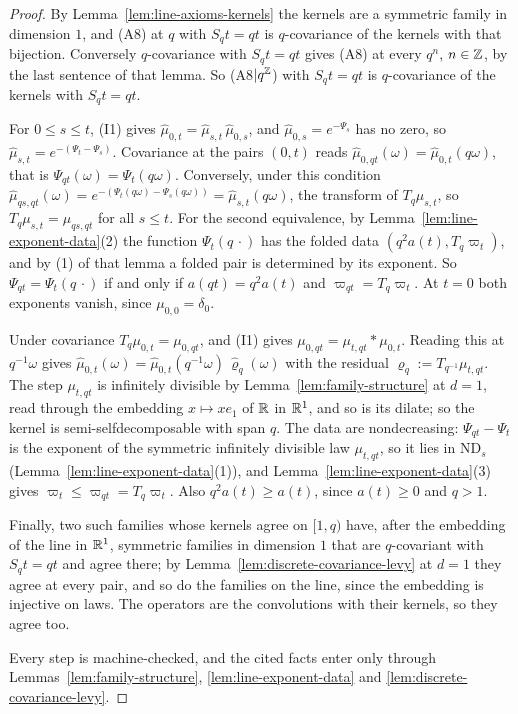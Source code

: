 \begin{proof}
By Lemma~\ref{lem:line-axioms-kernels} the kernels are a symmetric family in dimension $1$, and
(A8) at $q$ with $S_qt = qt$ is $q$-covariance of the kernels with that bijection. Conversely
$q$-covariance with $S_q t = qt$ gives (A8) at every $q^n$, $n \in \mathbb{Z}$, by the last sentence of
that lemma. So (A8$|q^{\mathbb{Z}}$) with $S_qt = qt$ is $q$-covariance of the kernels with
$S_qt = qt$.

For $0 \le s \le t$, (I1) gives $\widehat\mu_{0,t} = \widehat\mu_{s,t}\,\widehat\mu_{0,s}$, and
$\widehat\mu_{0,s} = e^{-\Psi_s}$ has no zero, so
$\widehat\mu_{s,t} = e^{-(\Psi_t - \Psi_s)}$. Covariance at the pairs $(0, t)$ reads
$\widehat\mu_{0,qt}(\omega) = \widehat\mu_{0,t}(q\omega)$, that is
$\Psi_{qt}(\omega) = \Psi_t(q\omega)$. Conversely, under this condition
$\widehat\mu_{qs,qt}(\omega) = e^{-(\Psi_t(q\omega) - \Psi_s(q\omega))} = \widehat\mu_{s,t}(q\omega)$,
the transform of $T_q\mu_{s,t}$, so $T_q\mu_{s,t} = \mu_{qs,qt}$ for all $s \le t$. For the
second equivalence, by Lemma~\ref{lem:line-exponent-data}(2) the function $\Psi_t(q\,\cdot)$ has
the folded data $(q^2a(t), T_q\varpi_t)$, and by (1) of that lemma a folded pair is determined by
its exponent. So $\Psi_{qt} = \Psi_t(q\,\cdot)$ if and only if $a(qt) = q^2a(t)$ and
$\varpi_{qt} = T_q\varpi_t$. At $t = 0$ both exponents vanish, since $\mu_{0,0} = \delta_0$.

Under covariance $T_q\mu_{0,t} = \mu_{0,qt}$, and (I1) gives
$\mu_{0,qt} = \mu_{t,qt} * \mu_{0,t}$. Reading this at $q^{-1}\omega$ gives
$\widehat\mu_{0,t}(\omega) = \widehat\mu_{0,t}(q^{-1}\omega)\,\widehat\varrho_q(\omega)$ with the
residual $\varrho_q := T_{q^{-1}}\mu_{t,qt}$. The step $\mu_{t,qt}$ is infinitely divisible by
Lemma~\ref{lem:family-structure} at $d = 1$, read through the embedding $x \mapsto xe_1$ of $\mathbb{R}$
in $\mathbb{R}^1$, and so is its dilate; so the kernel is semi-selfdecomposable with span $q$. The data
are nondecreasing: $\Psi_{qt} - \Psi_t$ is the exponent of the symmetric infinitely divisible law
$\mu_{t,qt}$, so it lies in $\mathrm{ND}_s$ (Lemma~\ref{lem:line-exponent-data}(1)), and
Lemma~\ref{lem:line-exponent-data}(3) gives $\varpi_t \le \varpi_{qt} = T_q\varpi_t$. Also
$q^2a(t) \ge a(t)$, since $a(t) \ge 0$ and $q > 1$.

Finally, two such families whose kernels agree on $[1, q)$ have, after the embedding of the line
in $\mathbb{R}^1$, symmetric families in dimension $1$ that are $q$-covariant with $S_qt = qt$ and agree
there; by Lemma~\ref{lem:discrete-covariance-levy} at $d = 1$ they agree at every pair, and so do
the families on the line, since the embedding is injective on laws. The operators are the
convolutions with their kernels, so they agree too.

Every step is machine-checked, and the cited facts enter only through
Lemmas~\ref{lem:family-structure}, \ref{lem:line-exponent-data} and
\ref{lem:discrete-covariance-levy}.
\end{proof}

